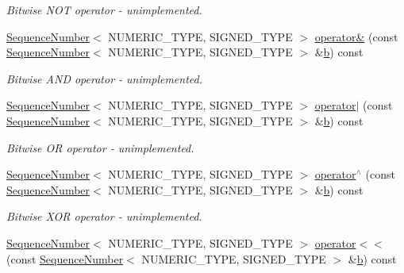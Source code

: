 \begin{DoxyCompactItemize}
\begin{DoxyCompactList}\small\item\em Bitwise N\+OT operator -\/ unimplemented. \end{DoxyCompactList}\item 
\hyperlink{classns3_1_1SequenceNumber}{Sequence\+Number}$<$ N\+U\+M\+E\+R\+I\+C\+\_\+\+T\+Y\+PE, S\+I\+G\+N\+E\+D\+\_\+\+T\+Y\+PE $>$ \hyperlink{classns3_1_1SequenceNumber_a75d32b427aabed3fdd45de6df43ce203}{operator\&} (const \hyperlink{classns3_1_1SequenceNumber}{Sequence\+Number}$<$ N\+U\+M\+E\+R\+I\+C\+\_\+\+T\+Y\+PE, S\+I\+G\+N\+E\+D\+\_\+\+T\+Y\+PE $>$ \&\hyperlink{lte__pathloss_8m_a21ad0bd836b90d08f4cf640b4c298e7c}{b}) const 
\begin{DoxyCompactList}\small\item\em Bitwise A\+ND operator -\/ unimplemented. \end{DoxyCompactList}\item 
\hyperlink{classns3_1_1SequenceNumber}{Sequence\+Number}$<$ N\+U\+M\+E\+R\+I\+C\+\_\+\+T\+Y\+PE, S\+I\+G\+N\+E\+D\+\_\+\+T\+Y\+PE $>$ \hyperlink{classns3_1_1SequenceNumber_abdd4362289dbde52722a55769355a1ce}{operator$\vert$} (const \hyperlink{classns3_1_1SequenceNumber}{Sequence\+Number}$<$ N\+U\+M\+E\+R\+I\+C\+\_\+\+T\+Y\+PE, S\+I\+G\+N\+E\+D\+\_\+\+T\+Y\+PE $>$ \&\hyperlink{lte__pathloss_8m_a21ad0bd836b90d08f4cf640b4c298e7c}{b}) const 
\begin{DoxyCompactList}\small\item\em Bitwise OR operator -\/ unimplemented. \end{DoxyCompactList}\item 
\hyperlink{classns3_1_1SequenceNumber}{Sequence\+Number}$<$ N\+U\+M\+E\+R\+I\+C\+\_\+\+T\+Y\+PE, S\+I\+G\+N\+E\+D\+\_\+\+T\+Y\+PE $>$ \hyperlink{classns3_1_1SequenceNumber_a5b01c96bb809a5493c0a12186c00d001}{operator$^\wedge$} (const \hyperlink{classns3_1_1SequenceNumber}{Sequence\+Number}$<$ N\+U\+M\+E\+R\+I\+C\+\_\+\+T\+Y\+PE, S\+I\+G\+N\+E\+D\+\_\+\+T\+Y\+PE $>$ \&\hyperlink{lte__pathloss_8m_a21ad0bd836b90d08f4cf640b4c298e7c}{b}) const 
\begin{DoxyCompactList}\small\item\em Bitwise X\+OR operator -\/ unimplemented. \end{DoxyCompactList}\item 
\hyperlink{classns3_1_1SequenceNumber}{Sequence\+Number}$<$ N\+U\+M\+E\+R\+I\+C\+\_\+\+T\+Y\+PE, S\+I\+G\+N\+E\+D\+\_\+\+T\+Y\+PE $>$ \hyperlink{classns3_1_1SequenceNumber_a76d32abe805797dff81712a5dda2cdc1}{operator$<$$<$} (const \hyperlink{classns3_1_1SequenceNumber}{Sequence\+Number}$<$ N\+U\+M\+E\+R\+I\+C\+\_\+\+T\+Y\+PE, S\+I\+G\+N\+E\+D\+\_\+\+T\+Y\+PE $>$ \&\hyperlink{lte__pathloss_8m_a21ad0bd836b90d08f4cf640b4c298e7c}{b}) const 

\end{DoxyCompactItemize}

